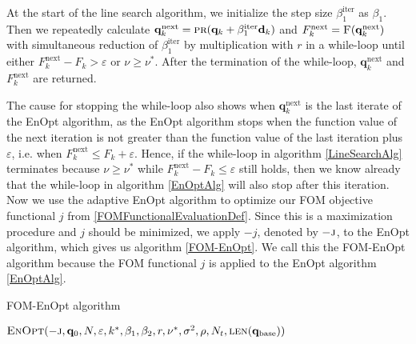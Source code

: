 At the start of the line search algorithm, we initialize the step size $\beta^\mathrm{iter}_1$ as $\beta_1$. Then we repeatedly calculate $\mathbf{q}^\mathrm{next}_k = \Call{pr}{\mathbf{q}_k+\beta^\mathrm{iter}_1\mathbf{d}_k}$ and $F^\mathrm{next}_k = \Call{F}{\mathbf{q}^\mathrm{next}_k}$ with simultaneous reduction of $\beta^\mathrm{iter}_1$ by multiplication with $r$ in a while-loop until either $F^\mathrm{next}_k-F_k>\varepsilon$ or $\nu\geq\nu^*$. After the termination of the while-loop, $\mathbf{q}^\mathrm{next}_k$ and $F^\mathrm{next}_k$ are returned.

The cause for stopping the while-loop also shows when $\mathbf{q}^\mathrm{next}_k$ is the last iterate of the EnOpt algorithm, as the EnOpt algorithm stops when the function value of the next iteration is not greater than the function value of the last iteration plus $\varepsilon$, i.e. when $F^\mathrm{next}_k\leq F_k+\varepsilon$. Hence, if the while-loop in algorithm \ref{LineSearchAlg} terminates because $\nu\geq\nu^*$ while $F^\mathrm{next}_k-F_k\leq\varepsilon$ still holds, then we know already that the while-loop in algorithm \ref{EnOptAlg} will also stop after this iteration.\\

Now we use the adaptive EnOpt algorithm to optimize our FOM objective functional $j$ from \eqref{FOMFunctionalEvaluationDef}. Since this is a maximization procedure and $j$ should be minimized, we apply $-j$, denoted by $-\textproc{j}$, to the EnOpt algorithm, which gives us algorithm \ref{FOM-EnOpt}. We call this the FOM-EnOpt algorithm because the FOM functional $j$ is applied to the EnOpt algorithm \ref{EnOptAlg}.

\begin{algorithm}[H]%
\caption{\label{FOM-EnOpt}FOM-EnOpt algorithm}
\begin{algorithmic}[1]
\State \Return $\Call{EnOpt}{-\textproc{j},\mathbf{q}_0,N,\varepsilon,k^*,\beta_1,\beta_2,r,\nu^*,\sigma^2,\rho, N_t, \protect\Call{len}{\mathbf{q}_\mathrm{base}}}$
\EndFunction
\end{algorithmic}
\end{algorithm}

